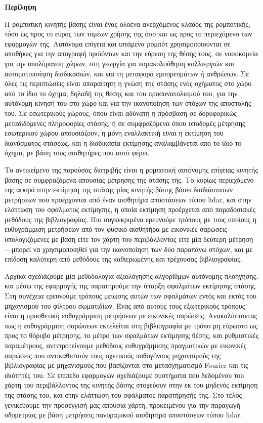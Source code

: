 \singlespace

\vfill
\begin{center}
\textbf{Περίληψη}
\end{center}
\noindent

Η ρομποτική κινητής βάσης είναι ένας ολοένα ανερχόμενος κλάδος της ρομποτικής,
τόσο ως προς το εύρος των τομέων χρήσης της όσο και ως προς το περιεχόμενο των
εφαρμογών της. Αυτόνομα επίγεια και ιπτάμενα ρομπότ χρησιμοποιούνται σε
αποθήκες για την απογραφή προϊόντων και την εύρεση της θέσης τους, σε
νοσοκομεία για την απολύμανση χώρων, στη γεωργία για παρακολούθηση καλλιεργιών
και αυτοματοποίηση διαδικασιών, και για τη μεταφορά εμπορευμάτων ή ανθρώπων. Σε
όλες τις περιπτώσεις είναι απαραίτητη η γνώση της στάσης ενός οχήματος στο χώρο
από το ίδιο το όχημα, δηλαδή της θέσης και του προσανατολισμού του, για την
αυτόνομη κίνησή του στο χώρο και για την ικανοποίηση των στόχων της αποστολής
του. Σε εσωτερικούς χώρους, όπου είναι αδύνατη η πρόσβαση σε δορυφορικώς
μεταδιδόμενες πληροφορίες στάσης, ή σε συμφραζόμενα όπου υποδομές μέτρησης
εσωτερικού χώρου απουσιάζουν, η μόνη εναλλακτική είναι η εκτίμηση του
διανύσματος στάσεως, και η διαδικασία εκτίμησης αναλαμβάνεται από το ίδιο το
όχημα, με βάση τους αισθητήρες που αυτό φέρει.

Το αντικείμενο της παρούσας διατριβής είναι η ρομποτική αυτόνομης επίγειας
κινητής βάσης σε συμφραζόμενα απουσίας μέτρησης της στάσης της. Το κυρίως
περιεχόμενο της αφορά στην εκτίμηση της στάσης μίας κινητής βάσης βάσει
δισδιάστατων μετρήσεων που προέρχονται από έναν αισθητήρα αποστάσεων τύπου
lidar, και στην ελάττωση του σφάλματος εκτίμησης, η οποία εκτίμηση προέρχεται
από παραδοσιακές μεθόδους της βιβλιογραφίας. Πιο συγκεκριμένα ερευνούμε τρόπους
με τους οποίους η ευθυγράμμιση μετρήσεων από τον φυσικό αισθητήρα με εικονικές
σαρώσεις---υπολογιζόμενες με βάση είτε τον χάρτη του περιβάλλοντος είτε μία
δεύτερη μέτρηση---μπορεί να χρησιμοποιηθεί για την ικανοποίηση των δύο παραπάνω
στόχων, και με επίδοση καλύτερη από μεθόδους της καθιερωμένης και τρέχουσας
βιβλιογραφίας.

Αρχικά σχεδιάζουμε μία μεθοδολογία αξιολόγησης αλγορίθμων αυτόνομης πλοήγησης,
και μέσω της εφαρμογής της παρατηρούμε την ύπαρξη σφαλμάτων εκτίμησης στάσης.
Στη συνέχεια ερευνούμε τρόπους μείωσης αυτών των σφαλμάτων εντός και εκτός του
μηχανισμού του φίλτρου σωματιδίων. Ένας από αυτούς τους εξωτερικούς τρόπους
είναι η προσθετική ευθυγράμμιση μετρήσεων με εικονικές σαρώσεις.
Ανακαλύπτοντας πως η ευθυγράμμιση σαρώσεων εκτελείται στη βιβλιογραφία με τρόπο
μη εύρωστο ως προς το θόρυβο μέτρησης, το μέτρο των σφαλμάτων εκτίμησης θέσης,
και ρυθμιστικές παραμέτρους, αντιπροτείνουμε μεθόδους ευθυγράμμισης πραγματικών
με εικονικές σαρώσεις που αντικαθιστούν τους σχετικούς παθογόνους μηχανισμούς
της βιβλιογραφίας με μηχανισμούς που βασίζονται στο μετασχηματισμό Fourier και
τις ιδιότητές του. Σε επίπεδο εφαρμογών σχεδιάζουμε συστήματα που δεδομένου
του χάρτη του περιβάλλοντος της κινητής βάσης στοχεύουν στην εκ του μηδενός
εκτίμηση της στάσης του, και στην ελάττωση του σφάλματος παρατήρησής της. Στο
τέλος γενικεύουμε την προσέγγισή μας απουσία χάρτη, προκειμένου για την
παραγωγή οδομετρίας με βάση μετρήσεις πανοραμικού αισθητήρα αποστάσεων τύπου
lidar.


